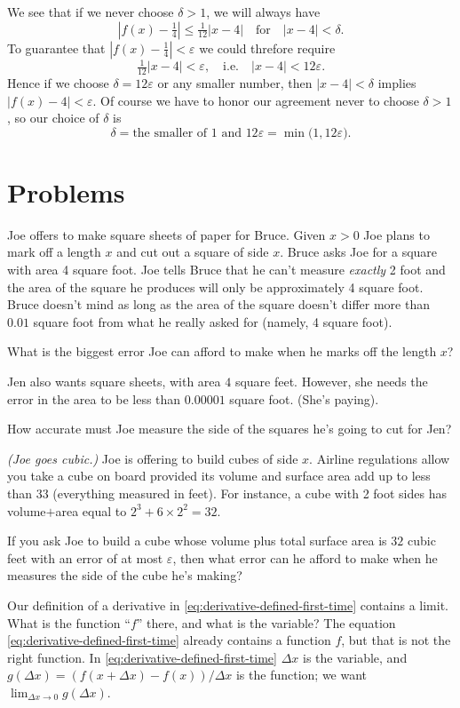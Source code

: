 We see that if we never choose $\delta>1$, we will always have
\[
|f(x) - \tfrac14|\leq \tfrac1{12}|x-4| \quad\text{for}\quad |x-4|<\delta.
\]
To guarantee that $|f(x)-\frac14|<\varepsilon$ we could threfore require
\[
\tfrac1{12} |x-4|<\varepsilon, \quad\text{i.e.}\quad |x-4| <12\varepsilon.
\]
Hence if we choose $\delta=12\varepsilon$ or any smaller number, then
$|x-4|<\delta$ implies $|f(x)-4|<\varepsilon$.  Of course we have to honor
our agreement never to choose $\delta>1$, so our choice of $\delta$ is
\[
\delta = \text{the smaller of }1\text{ and }12\varepsilon = \min \bigl(1,
12\varepsilon\bigr).
\]

\section{Problems}
\problemfont
\problem \groupproblem Joe offers to make square sheets of paper for
Bruce.  Given $x>0$ Joe plans to mark off a length $x$ and cut out a
square of side $x$.  Bruce asks Joe for a square with area 4 square
foot.  Joe tells Bruce that he can't measure \emph{exactly} 2 foot and
the area of the square he produces will only be approximately 4 square
foot.  Bruce doesn't mind as long as the area of the square doesn't
differ more than $0.01$ square foot from what he really asked for
(namely, 4 square foot).

\subprob What is the biggest error Joe can afford to make when he
marks off the length $x$?

\subprob Jen also wants square sheets, with area $4$ square feet.
However, she needs the error in the area to be less than $0.00001$
square foot.  (She's paying).

How accurate must Joe measure the side of the squares he's going to cut
for Jen?

\problem \groupproblem \textit{(Joe goes cubic.)}  Joe is offering to
build cubes of side $x$.  Airline regulations allow you take a cube on
board provided its volume and surface area add up to less than $33$
(everything measured in feet).  For instance, a cube with 2 foot sides
has volume$+$area equal to $2^3 + 6\times 2^2 = 32$.

If you ask Joe to build a cube whose volume plus total surface area is
$32$ cubic feet with an error of at most $\varepsilon$, then what error
can he afford to make when he measures the side of the cube he's
making?

\problem Our definition of a derivative in
\eqref{eq:derivative-defined-first-time} contains a limit.  What is the
function ``$f$'' there, and what is the variable?
\answer
The equation \eqref{eq:derivative-defined-first-time} already
contains a function $f$, but that is not the right function.  In
\eqref{eq:derivative-defined-first-time} $\Delta x$ is the variable,
and $g(\Delta x) = (f(x+\Delta x)-f(x))/\Delta x$ is the function; we
want $\lim_{\Delta x\to 0}g(\Delta x)$.
\endanswer

